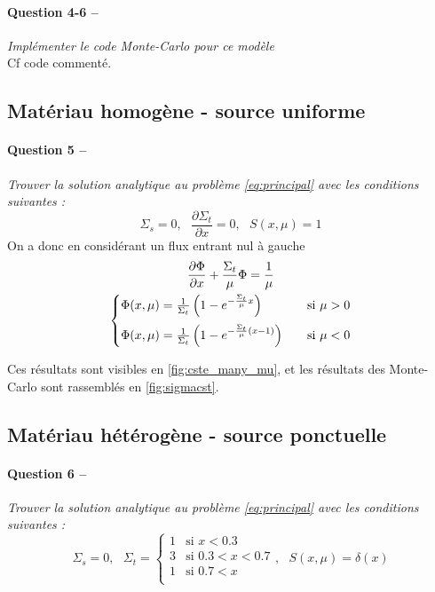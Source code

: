 \documentclass[11pt,a4paper]{article}
\newcommand{\dx}[1]{\dfrac{\partial #1}{\partial x}}
\newcommand{\question}[2]{\paragraph{Question #1 --}\hspace{-7pt}\textit{#2} \\}
\begin{document}
\question{4-6}{Implémenter le code Monte-Carlo pour ce modèle}

Cf code commenté.



\subsection{Matériau homogène - source uniforme}

\question{5}{Trouver la solution analytique au problème \autoref{eq:principal} avec les conditions suivantes :}

\begin{equation}
  \Sigma_s=0, ~~~ \dx{\Sigma_t} = 0, ~~~ S(x, \mu) = 1
\end{equation}
On a donc en considérant un flux entrant nul à gauche 
\begin{gather}
  \dx{\Phi} + \frac{\Sigma_t}{\mu} \Phi = \frac{1}{\mu} \\
  \begin{cases}
    \Phi(x, \mu)= \frac{1}{\Sigma_t}\left( 1-e^{-\frac{\Sigma_t}{\mu}x}\right) &~~~ \mbox{si } \mu>0 \medskip \\ %
    \Phi(x, \mu)= \frac{1}{\Sigma_t}\left( 1-e^{-\frac{\Sigma_t}{\mu}(x-1)}\right) &~~~ \mbox{si } \mu<0 
  \end{cases}
\end{gather}

Ces résultats sont visibles en \autoref{fig:cste_many_mu}, et les résultats des Monte-Carlo sont rassemblés en \autoref{fig:sigmacst}.


\subsection{Matériau hétérogène - source ponctuelle}

\question{6}{Trouver la solution analytique au problème \autoref{eq:principal} avec les conditions suivantes :}

\begin{equation}
  \Sigma_s=0, ~~~
  \Sigma_t =
  \begin{cases}
    1 &\mbox{si } x<0.3 \\
    3 &\mbox{si } 0.3<x<0.7 \\
    1 &\mbox{si } 0.7<x \\
  \end{cases}
  , ~~~ S(x, \mu) = \delta(x)
\end{equation}
\end{document}
